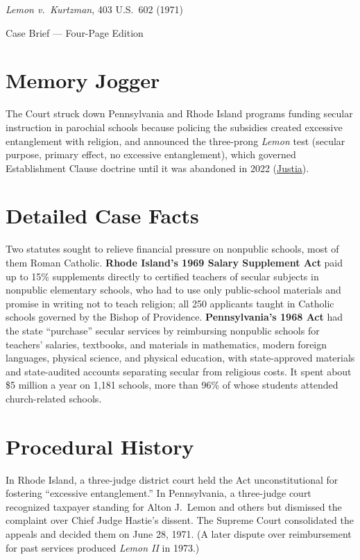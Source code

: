 \documentclass[12pt]{article}
\begin{document}
\begin{center}
{\LARGE \textit{Lemon v.\ Kurtzman}, 403 U.S.\ 602 (1971)\par}
\vspace{0.8em}
{\large Case Brief --- Four-Page Edition\par}
\end{center}
\vspace{1em}

\section{Memory Jogger}

The Court struck down Pennsylvania and Rhode Island programs funding secular instruction in parochial schools because policing the subsidies created excessive entanglement with religion, and announced the three-prong \textit{Lemon} test (secular purpose, primary effect, no excessive entanglement), which governed Establishment Clause doctrine until it was abandoned in 2022 (\href{https://supreme.justia.com/cases/federal/us/403/602/}{Justia}).

\section{Detailed Case Facts}

Two statutes sought to relieve financial pressure on nonpublic schools, most of them Roman Catholic. \textbf{Rhode Island's 1969 Salary Supplement Act} paid up to 15\% supplements directly to certified teachers of secular subjects in nonpublic elementary schools, who had to use only public-school materials and promise in writing not to teach religion; all 250 applicants taught in Catholic schools governed by the Bishop of Providence. \textbf{Pennsylvania's 1968 Act} had the state ``purchase'' secular services by reimbursing nonpublic schools for teachers' salaries, textbooks, and materials in mathematics, modern foreign languages, physical science, and physical education, with state-approved materials and state-audited accounts separating secular from religious costs. It spent about \$5 million a year on 1,181 schools, more than 96\% of whose students attended church-related schools.

\section{Procedural History}

In Rhode Island, a three-judge district court held the Act unconstitutional for fostering ``excessive entanglement.'' In Pennsylvania, a three-judge court recognized taxpayer standing for Alton J.\ Lemon and others but dismissed the complaint over Chief Judge Hastie's dissent. The Supreme Court consolidated the appeals and decided them on June 28, 1971. (A later dispute over reimbursement for past services produced \textit{Lemon II} in 1973.)
\end{document}
